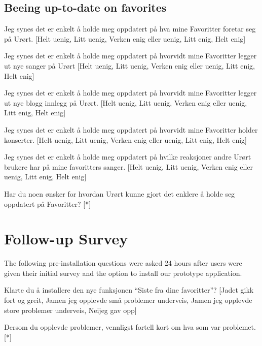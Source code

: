 \subsection{Beeing up-to-date on favorites}

\begin{enum}
  \item Jeg synes det er enkelt å holde meg oppdatert på
    hva mine Favoritter foretar seg på Urørt.
    [Helt uenig, Litt uenig, Verken enig eller uenig, Litt enig, Helt enig]
  \item Jeg synes det er enkelt å holde meg oppdatert på
    hvorvidt mine Favoritter legger ut nye sanger på Urørt
    [Helt uenig, Litt uenig, Verken enig eller uenig, Litt enig, Helt enig]
  \item Jeg synes det er enkelt å holde meg oppdatert på
    hvorvidt mine Favoritter legger ut nye blogg innlegg på Urørt.
    [Helt uenig, Litt uenig, Verken enig eller uenig, Litt enig, Helt enig]
  \item Jeg synes det er enkelt å holde meg oppdatert på
    hvorvidt mine Favoritter holder konserter.
    [Helt uenig, Litt uenig, Verken enig eller uenig, Litt enig, Helt enig]
  \item Jeg synes det er enkelt å holde meg oppdatert på
    hvilke reaksjoner andre Urørt brukere har på mine favoritters sanger.
    [Helt uenig, Litt uenig, Verken enig eller uenig, Litt enig, Helt enig]
  \item Har du noen ønsker for hvordan Urørt kunne gjort det enklere å holde
    seg oppdatert på Favoritter? [*]
\end{enum}


\section{Follow-up Survey}

The following pre-installation questions were asked 24 hours after users were
given their initial survey and the option to install our prototype
application.

\begin{enum}
  \item * Klarte du å installere den nye funksjonen ``Siste fra dine
    favoritter''?
    [Ja\dash{}det gikk fort og greit,
    Ja\dash{}men jeg opplevde små problemer underveis,
    Ja\dash{}men jeg opplevde store problemer underveis,
    Nei\dash{}jeg gav opp]
  \item Dersom du opplevde problemer, vennligst fortell kort om hva som var
    problemet. [*]
\end{enum}

